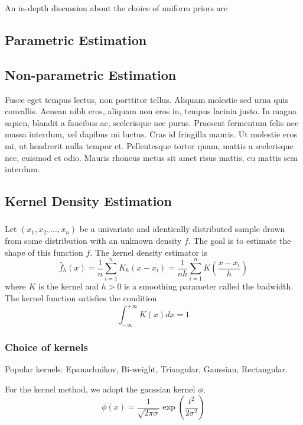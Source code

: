 An in-depth discussion about the choice of uniform priors are

\subsection{Parametric Estimation}



\subsection{Non-parametric Estimation}
 Fusce eget tempus lectus, non porttitor tellus. Aliquam molestie sed urna quis convallis. Aenean nibh eros, aliquam non eros in, tempus lacinia justo. In magna sapien, blandit a faucibus ac, scelerisque nec purus. Praesent fermentum felis nec massa interdum, vel dapibus mi luctus. Cras id fringilla mauris. Ut molestie eros mi, ut hendrerit nulla tempor et. Pellentesque tortor quam, mattis a scelerisque nec, euismod et odio. Mauris rhoncus metus sit amet risus mattis, eu mattis sem interdum.

\subsection{Kernel Density Estimation}

\subsubsection{}
Let $(x_1,x_2,...,x_n)$ be a univariate and identically distributed sample drawn from some distribution with an unknown density $f$.
The goal is to estimate the shape of this function $f$.  The kernel density estimator is
\begin{equation}
  \hat{f}_h(x)=\frac{1}{n}\sum_{i=1}^{n}K_h(x-x_i)
    =\frac{1}{nh}\sum_{i=1}^{n}K\left(\frac{x-x_i}{h}\right)
\end{equation}
where $K$ is the kernel and $h>0$ is a smoothing parameter called the badwidth.  The kernel function satisfies the condition
\begin{equation}
  \int_{-\infty}^{+\infty}K(x)dx=1
\end{equation}
\subsubsection{Choice of kernels}
Popular kernels: Epanachnikov, Bi-weight, Triangular, Gaussian, Rectangular.

For the kernel method, we adopt the gaussian kernel $\phi$,
\begin{equation}
  \phi(x)=\frac{1}{\sqrt{2\pi\sigma}}\exp{\left(\frac{t^2}{2\sigma^2}\right)}
\end{equation}
